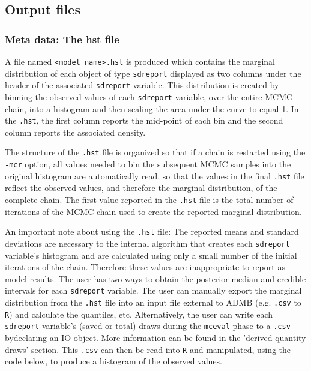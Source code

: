 \documentclass{article}\usepackage[]{graphicx}\usepackage[]{color}
\begin{document}
\subsection{Output files}\label{sec:outfiles}
\subsubsection{Meta data: The hst file}
A file named \texttt{<model name>.hst} is produced which contains the
marginal distribution of each object of type \texttt{sdreport} displayed 
as two columns under the header of the associated \texttt{sdreport} variable. 
This distribution is created by binning the observed values of each 
\texttt{sdreport} variable, over the entire MCMC chain, into a histogram and 
then scaling the area under the curve to equal 1. In the \texttt{.hst}, the 
first column reports the mid-point of each bin and the second column reports 
the associated density.

The structure of the \texttt{.hst} file is organized so that if a chain is 
restarted using the \texttt{-mcr} option, all values needed to bin the 
subsequent MCMC samples into the original histogram are automatically read, 
so that the values in the final \texttt{.hst} file reflect the observed values, 
and therefore the marginal distribution, of the complete chain. The first value 
reported in the \texttt{.hst} file is the total number of iterations of the 
MCMC chain used to create the reported marginal distribution.

An important note about using the \texttt{.hst} file: The reported means and 
standard deviations are necessary to the internal algorithm that creates 
each \texttt{sdreport} variable's histogram and are calculated using only a 
small number of the initial iterations of the chain. Therefore these values 
are inappropriate to report as model results. The user has two ways to obtain 
the posterior median and credible intervals for each \texttt{sdreport} variable. 
The user can manually export the marginal distribution from the \texttt{.hst} 
file into an input file external to ADMB (e.g. \texttt{.csv} to \texttt{R}) and 
calculate the quantiles, etc. Alternatively, the user can write each \texttt{sdreport} 
variable's (saved or total) draws during the \texttt{mceval} phase to a \texttt{.csv} 
bydeclaring an IO object. More information can be found in the 'derived quantity draws' 
section. This \texttt{.csv} can then be read into \texttt{R} and manipulated, 
using the code below, to produce a histogram of the observed values.
\end{document}
